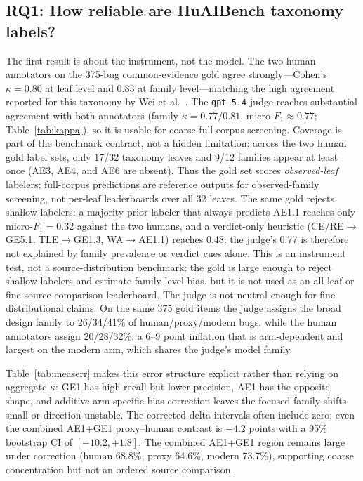 \documentclass[conference]{IEEEtran}
\begin{document}
\subsection{RQ1: How reliable are HuAIBench taxonomy labels?}
\label{sec:rq1}
The first result is about the instrument, not the model. The two human annotators on
the 375-bug common-evidence gold agree strongly---Cohen's $\kappa=0.80$ at leaf level
and $0.83$ at family level---matching the high agreement reported for this taxonomy
by Wei et al.~\cite{wei2026evaluating}. The \texttt{gpt-5.4} judge reaches
substantial agreement with both annotators (family $\kappa=0.77/0.81$,
micro-$F_1\approx0.77$; Table~\ref{tab:kappa}), so it is usable for coarse
full-corpus screening. Coverage is part of the benchmark contract, not a hidden
limitation: across the two human gold label sets, only 17/32 taxonomy leaves and
9/12 families appear at least once (AE3, AE4, and AE6 are absent). Thus the gold set
scores \emph{observed-leaf} labelers; full-corpus predictions are reference outputs
for observed-family screening, not per-leaf leaderboards over all 32 leaves.
The same gold rejects shallow labelers: a majority-prior labeler that always predicts
AE1.1 reaches only micro-$F_1=0.32$ against the two humans, and a verdict-only
heuristic (CE/RE$\to$GE5.1, TLE$\to$GE1.3, WA$\to$AE1.1) reaches 0.48; the judge's
0.77 is therefore not explained by family prevalence or verdict cues alone. This is
an instrument test, not a source-distribution benchmark: the gold is large enough to
reject shallow labelers and estimate family-level bias, but it is not used as an
all-leaf or fine source-comparison leaderboard.
The judge is not neutral enough for fine distributional claims. On
the same 375 gold items the judge assigns the broad design family to 26/34/41\% of
human/proxy/modern bugs, while the human annotators assign 20/28/32\%: a 6--9 point
inflation that is arm-dependent and largest on the modern arm, which shares the
judge's model family.



Table~\ref{tab:measerr} makes this error structure explicit rather than relying on
aggregate $\kappa$: GE1 has high recall but lower precision, AE1 has the opposite
shape, and additive arm-specific bias correction leaves the focused family shifts
small or direction-unstable. The corrected-delta intervals often include zero; even
the combined AE1+GE1 proxy--human contrast is $-4.2$ points with a 95\% bootstrap CI
of $[-10.2,+1.8]$. The combined AE1+GE1 region remains large under correction
(human 68.8\%, proxy 64.6\%, modern 73.7\%), supporting coarse concentration but not
an ordered source comparison.
\end{document}
